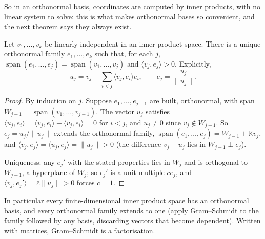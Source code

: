 So in an orthonormal basis, coordinates are computed by inner products, with no linear system to solve: this is what
makes orthonormal bases so convenient, and the next theorem says they always exist.

\begin{theorem}\label{thm:gramschmidt}
Let $v_1,\dots,v_k$ be linearly independent in an inner product space. There is a unique orthonormal family
$e_1,\dots,e_k$ such that, for each $j$, $\operatorname{span}(e_1,\dots,e_j)=\operatorname{span}(v_1,\dots,v_j)$ and
$\langle v_j,e_j\rangle>0$. Explicitly,
\[
u_j=v_j-\sum_{i<j}\langle v_j,e_i\rangle e_i,\qquad e_j=\frac{u_j}{\|u_j\|}.
\]
\end{theorem}
\begin{proof}
By induction on $j$. Suppose $e_1,\dots,e_{j-1}$ are built, orthonormal, with span $W_{j-1}=\operatorname{span}(v_1,\dots,
v_{j-1})$. The vector $u_j$ satisfies $\langle u_j,e_i\rangle=\langle v_j,e_i\rangle-\langle v_j,e_i\rangle=0$ for $i<j$,
and $u_j\ne0$ since $v_j\notin W_{j-1}$. So $e_j=u_j/\|u_j\|$ extends the orthonormal family, $\operatorname{span}(e_1,
\dots,e_j)=W_{j-1}+\mathbb Kv_j$, and $\langle v_j,e_j\rangle=\langle u_j,e_j\rangle=\|u_j\|>0$ (the difference $v_j-u_j$
lies in $W_{j-1}\perp e_j$).

Uniqueness: any $e_j'$ with the stated properties lies in $W_j$ and is orthogonal to $W_{j-1}$, a hyperplane of $W_j$; so
$e_j'$ is a unit multiple $ce_j$, and $\langle v_j,e_j'\rangle=\bar c\|u_j\|>0$ forces $c=1$.
\end{proof}

In particular every finite-dimensional inner product space has an orthonormal basis, and every orthonormal family extends
to one (apply Gram--Schmidt to the family followed by any basis, discarding vectors that become dependent). Written with
matrices, Gram--Schmidt is a factorisation.

